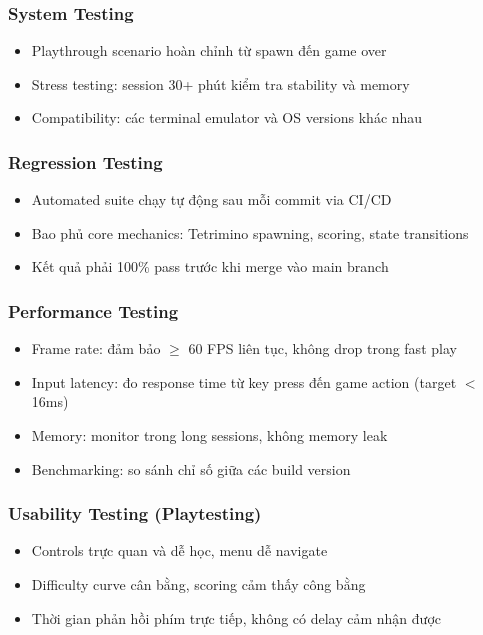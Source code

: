 \documentclass[12pt,a4paper]{article}
\begin{document}
\subsubsection{System Testing}
\begin{itemize}[leftmargin=3em]
  \item Playthrough scenario hoàn chỉnh từ spawn đến game over
  \item Stress testing: session 30+ phút kiểm tra stability và memory
  \item Compatibility: các terminal emulator và OS versions khác nhau
\end{itemize}

\subsubsection{Regression Testing}
\begin{itemize}[leftmargin=3em]
  \item Automated suite chạy tự động sau mỗi commit via CI/CD
  \item Bao phủ core mechanics: Tetrimino spawning, scoring, state transitions
  \item Kết quả phải 100\% pass trước khi merge vào main branch
\end{itemize}

\subsubsection{Performance Testing}
\begin{itemize}[leftmargin=3em]
  \item Frame rate: đảm bảo $\geq$ 60 FPS liên tục, không drop trong fast play
  \item Input latency: đo response time từ key press đến game action (target $<$ 16ms)
  \item Memory: monitor trong long sessions, không memory leak
  \item Benchmarking: so sánh chỉ số giữa các build version
\end{itemize}

\subsubsection{Usability Testing (Playtesting)}
\begin{itemize}[leftmargin=3em]
  \item Controls trực quan và dễ học, menu dễ navigate
  \item Difficulty curve cân bằng, scoring cảm thấy công bằng
  \item Thời gian phản hồi phím trực tiếp, không có delay cảm nhận được
\end{itemize}
\end{document}
